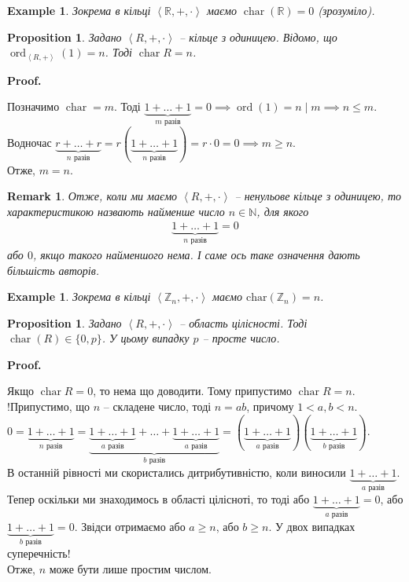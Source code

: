 \documentclass[a4paper, 10pt]{article}
\makeatletter
\theoremstyle{theoremdd}
\theoremstyle{theoremdd}
\theoremstyle{theoremdd}
\theoremstyle{theoremdd}
\theoremstyle{theoremdd}
\newtheorem{example}[theorem]{Example}
\theoremstyle{theoremdd}
\theoremstyle{theoremdd}
\theoremstyle{theoremdd}
\theoremstyle{theoremdd}
\newtheorem{proposition}[theorem]{Proposition}
\theoremstyle{theoremdd}
\theoremstyle{theoremdd}
\newtheorem{remark}[theorem]{Remark}
\theoremstyle{theoremdd}
\theoremstyle{theoremdd}
\theoremstyle{theoremdd}
\theoremstyle{theoremdd}
\renewenvironment{proof}[1][Proof.\\]{\par
\pushQED{\hfill \qed}%
\normalfont \topsep6\p@\@plus6\p@\relax
\trivlist
\item\relax
{\bfseries
#1\@addpunct{.}}\hspace\labelsep\ignorespaces
}{%
\popQED\endtrivlist\@endpefalse
}
\DeclareMathOperator{\ord}{ord}
\DeclareMathOperator{\charac}{char}
\makeatother
\begin{document}
\begin{example}
Зокрема в кільці $\left< \mathbb{R},+,\cdot \right>$ маємо $\charac(\mathbb{R}) = 0$ (зрозуміло).
\end{example}

\begin{proposition}
Задано $\left<R, +, \cdot \right>$ -- кільце з одиницею. Відомо, що $\ord_{\left<R,+ \right>}(1) = n$. Тоді $\charac R = n$.
\end{proposition}

\begin{proof}
Позначимо $\charac = m$. Тоді $\underbrace{1 + \dots + 1}_{m \text{ разів}} = 0 \implies \ord(1) = n \mid m \implies n \leq m$.\\
Водночас $\underbrace{r + \dots + r}_{n \text{ разів}} = r(\underbrace{1 + \dots + 1}_{n \text{ разів}}) = r \cdot 0 = 0 \implies m \geq n$.\\
Отже, $m = n$.
\end{proof}

\begin{remark}
Отже, коли ми маємо $\left< R,+,\cdot\right>$ -- ненульове кільце з одиницею, то характеристикою назвають найменше число $n \in \mathbb{N}$, для якого
\begin{align*}
\underbrace{1+ \dots + 1}_{n \text{ разів}} = 0
\end{align*}
або $0$, якщо такого найменшого нема. І саме ось таке означення дають більшість авторів.
\end{remark}

\begin{example}
Зокрема в кільці $\left< \mathbb{Z}_n, +, \cdot \right>$ маємо $\text{char}(\mathbb{Z}_n) = n$.
\end{example}

\begin{proposition}
Задано $\left<R, +, \cdot \right>$ -- область цілісності. Тоді $\charac (R) \in \{0,p\}$. У цьому випадку $p$ -- просте число.
\end{proposition}

\begin{proof}
Якщо $\charac R = 0$, то нема що доводити. Тому припустимо $\charac R = n$.\\
!Припустимо, що $n$ -- складене число, тоді $n = ab$, причому $1 < a,b < n$.\\
$0 = \underbrace{1 + \dots + 1}_{n \text{ разів}} = \underbrace{\underbrace{1 + \dots + 1}_{a \text{ разів}} + \dots + \underbrace{1 + \dots + 1}_{a \text{ разів}}}_{b \text{ разів}} = (\underbrace{1 + \dots + 1}_{a \text{ разів}})(\underbrace{1 + \dots + 1}_{b \text{ разів}})$.\\
В останній рівності ми скористались дитрибутивністю, коли виносили $\underbrace{1 + \dots + 1}_{a \text{ разів}}$. Тепер оскільки ми знаходимось в області цілісноті, то тоді або $\underbrace{1 + \dots + 1}_{a \text{ разів}} = 0$, або $\underbrace{1 + \dots + 1}_{b \text{ разів}} = 0$. Звідси отримаємо або $a \geq n$, або $b \geq n$. У двох випадках суперечність!\\
Отже, $n$ може бути лише простим числом.
\end{proof}
\end{document}
